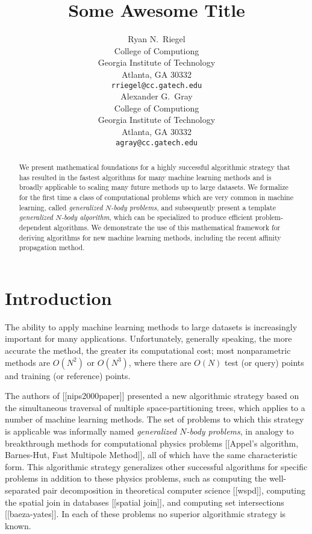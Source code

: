 \documentclass{article}
\title{Some Awesome Title}
\author{
Ryan N.~Riegel \\
College of Computiong \\
Georgia Institute of Technology \\
Atlanta, GA 30332 \\
\texttt{rriegel@cc.gatech.edu} \\
\And
Alexander G.~Gray \\
College of Computiong \\
Georgia Institute of Technology \\
Atlanta, GA 30332 \\
\texttt{agray@cc.gatech.edu} \\
}
\begin{document}
\makeanontitle

\begin{abstract}
We present mathematical foundations for a highly successful
algorithmic strategy that has resulted in the fastest algorithms for
many machine learning methods and is broadly applicable to scaling
many future methods up to large datasets.  We formalize for the first
time a class of computational problems which are very common in
machine learning, called {\em generalized $N$-body problems}, and
subsequently present a template {\em generalized $N$-body algorithm},
which can be specialized to produce efficient problem-dependent
algorithms.  We demonstrate the use of this mathematical framework for
deriving algorithms for new machine learning methods, including the
recent affinity propagation method.
\end{abstract}

\section{Introduction}

The ability to apply machine learning methods to large datasets is
increasingly important for many applications.  Unfortunately,
generally speaking, the more accurate the method, the greater its
computational cost; most nonparametric methods are $O(N^2)$ or
$O(N^3)$, where there are $O(N)$ test (or query) points and training
(or reference) points.

The authors of [[nips2000paper]] presented a new algorithmic strategy
based on the simultaneous traversal of multiple space-partitioning
trees, which applies to a number of machine learning methods.  The set
of problems to which this strategy is applicable was informally named
{\em generalized $N$-body problems}, in analogy to breakthrough
methods for computational physics problems [[Appel's algorithm,
Barnes-Hut, Fast Multipole Method]], all of which have the same
characteristic form.  This algorithmic strategy generalizes other
successful algorithms for specific problems in addition to these
physics problems, such as computing the well-separated pair
decomposition in theoretical computer science [[wspd]], computing the
spatial join in databases [[spatial join]], and computing set
intersections [[baeza-yates]].  In each of these problems no superior
algorithmic strategy is known.
\end{document}
